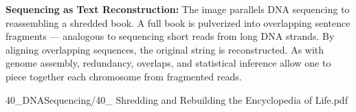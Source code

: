 \begin{SideNotePage}{
  \textbf{Sequencing as Text Reconstruction:}  
  The image parallels DNA sequencing to reassembling a shredded book. A full book is pulverized into overlapping sentence fragments — analogous to sequencing short reads from long DNA strands. By aligning overlapping sequences, the original string is reconstructed. As with genome assembly, redundancy, overlaps, and statistical inference allow one to piece together each chromosome from fragmented reads. \par
}{40_DNASequencing/40_ Shredding and Rebuilding the Encyclopedia of Life.pdf}
\end{SideNotePage}
